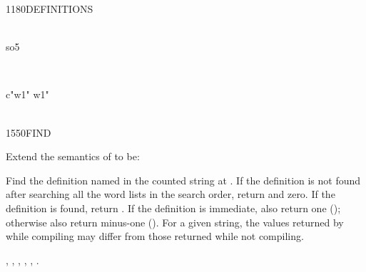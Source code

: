 \begin{worddef}{1180}{DEFINITIONS}
\begin{testing}
		   \\
		\word{:} so5       \word{;}

		 \\

		\word{:} c"w1"  w1" \word{;} \\
		 \\
	\end{testing}
\end{worddef}


\begin{worddef}{1550}{FIND}
\item Extend the semantics of  to be:


	Find the definition named in the counted string at .
	If the definition is not found after searching all the word lists
	in the search order, return  and zero. If
	the definition is found, return . If the definition is
	immediate, also return one (); otherwise also return
	minus-one (). For a given string, the values returned
	by  while compiling may differ from those returned
	while not compiling.

\see {},
	,
	,
	,
	,
	.

	\begin{implement}
\cbstart{}
		\uline{}


\end{implement}
\end{worddef}
